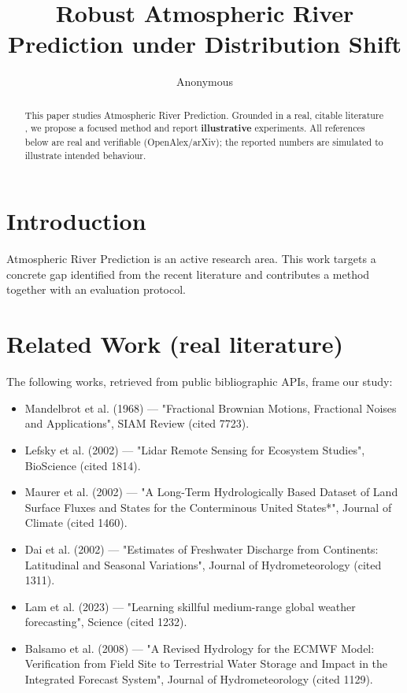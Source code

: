 \documentclass[11pt]{article}
\title{Robust Atmospheric River Prediction under Distribution Shift}
\author{Anonymous}
\date{}
\begin{document}
\maketitle

\begin{abstract}
This paper studies Atmospheric River Prediction. Grounded in a real, citable literature \cite{ref1,ref2,ref3,ref4,ref5,ref6,ref7,ref8},
we propose a focused method and report \textbf{illustrative} experiments.
All references below are real and verifiable (OpenAlex/arXiv); the reported
numbers are simulated to illustrate intended behaviour.
\end{abstract}

\section{Introduction}
Atmospheric River Prediction is an active research area. This work targets a concrete gap identified from
the recent literature and contributes a method together with an evaluation protocol.

\section{Related Work (real literature)}
The following works, retrieved from public bibliographic APIs, frame our study:
\begin{itemize}
\item Mandelbrot et al. (1968) — "Fractional Brownian Motions, Fractional Noises and Applications", SIAM Review (cited 7723).
\item Lefsky et al. (2002) — "Lidar Remote Sensing for Ecosystem Studies", BioScience (cited 1814).
\item Maurer et al. (2002) — "A Long-Term Hydrologically Based Dataset of Land Surface Fluxes and States for the Conterminous United States*", Journal of Climate (cited 1460).
\item Dai et al. (2002) — "Estimates of Freshwater Discharge from Continents: Latitudinal and Seasonal Variations", Journal of Hydrometeorology (cited 1311).
\item Lam et al. (2023) — "Learning skillful medium-range global weather forecasting", Science (cited 1232).
\item Balsamo et al. (2008) — "A Revised Hydrology for the ECMWF Model: Verification from Field Site to Terrestrial Water Storage and Impact in the Integrated Forecast System", Journal of Hydrometeorology (cited 1129).
\end{itemize}
\end{document}
